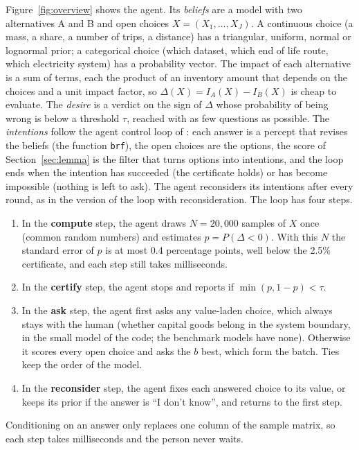 \documentclass{article}
\begin{document}
Figure~\ref{fig:overview} shows the agent. Its \emph{beliefs} are a model with two alternatives A and B
and open choices $X=(X_1,\dots,X_J)$. A continuous choice (a mass, a share, a number of trips, a
distance) has a triangular, uniform, normal or lognormal prior; a categorical choice (which dataset, which
end of life route, which electricity system) has a probability vector. The impact of each alternative is
a sum of terms, each the product of an inventory amount that depends on the choices and a unit impact
factor, so $\Delta(X)=I_A(X)-I_B(X)$ is cheap to evaluate. The \emph{desire} is a verdict on the sign of
$\Delta$ whose probability of being wrong is below a threshold $\tau$, reached with as few questions as
possible. The \emph{intentions} follow the agent control loop of \citet{wooldridge2009}: each answer is a
percept that revises the beliefs (the function \texttt{brf}), the open choices are the options, the score
of Section~\ref{sec:lemma} is the filter that turns options into intentions, and the loop ends when the
intention has succeeded (the certificate holds) or has become impossible (nothing is left to ask). The
agent reconsiders its intentions after every round, as in the version of the loop with reconsideration.
The loop has four steps.
\begin{enumerate}
\item In the \textbf{compute} step, the agent draws $N=20{,}000$ samples of $X$ once (common random
numbers) and estimates $p=P(\Delta<0)$. With this $N$ the standard error of $p$ is at most 0.4
percentage points, well below the 2.5\% certificate, and each step still takes milliseconds.
\item In the \textbf{certify} step, the agent stops and reports if $\min(p,1-p)<\tau$.
\item In the \textbf{ask} step, the agent first asks any value-laden choice, which always stays with the
human (whether capital goods belong in the system boundary, in the small model of the code; the benchmark
models have none). Otherwise it scores every open choice and asks
the $b$ best, which form the batch. Ties keep the order of the model.
\item In the \textbf{reconsider} step, the agent fixes each answered choice to its value, or keeps its
prior if the answer is ``I don't know'', and returns to the first step.
\end{enumerate}
Conditioning on an answer only replaces one column of the sample matrix, so each step takes milliseconds
and the person never waits.
\end{document}
